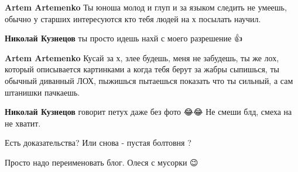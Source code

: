 \begin{itemize}
\begin{itemize}
\textbf{Artem Artemenko} Ты юноша молод и глуп и за языком следить не умеешь, обычно у старших интересуются кто тебя людей на х посылать научил.

 
\textbf{Николай Кузнецов} ты просто идешь нахй с моего разрешение 👍

 
\textbf{Artem Artemenko} Кусай за х, злее будешь, меня не забудешь, ты же лох, который описывается картинками а когда тебя берут за жабры сыпишься, ты обычный диванный ЛОХ, пыжишься пытаешься показать что ты сильный, а сам штанишки пачкаешь.

 
\textbf{Николай Кузнецов} говорит петух даже без фото 😂😂
Не смеши блд, смеха на не хватит.
\end{itemize}

 
Есть доказательства? Или снова - пустая болтовня ?

 
Просто надо переименовать блог.
Олеся с мусорки 😉

 


\end{itemize}
